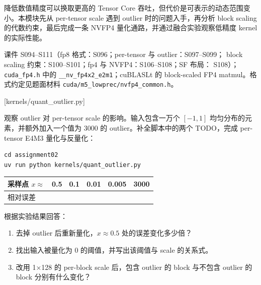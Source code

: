 \documentclass[11pt,a4paper,fontset=fandol]{ctexart}
\begin{document}
降低数值精度可以换取更高的 Tensor Core
吞吐，但代价是可表示的动态范围变小。本模块先从 per-tensor scale 遇到
outlier 时的问题入手，再分析 block scaling 的代数约束，最后完成一条
NVFP4 量化通路，并通过融合实验观察低精度 kernel 的实际性能。

\begin{reading}

课件 S094--S111（fp8 格式：S096；per-tensor 与 outlier：S097--S099；
block scaling 约束：S100--S101；fp4 与 NVFP4：S106--S108；SF 布局：
S108）；\texttt{cuda\_\allowbreak{}fp4.\allowbreak{}h} 中的
\texttt{\_\allowbreak{}\_\allowbreak{}nv\_\allowbreak{}fp4x2\_\allowbreak{}e2m1}；cuBLASLt
的 block-scaled FP4 matmul。格式约定见题面材料
\texttt{cuda/\allowbreak{}m5\_\allowbreak{}lowprec/\allowbreak{}nvfp4\_\allowbreak{}common.\allowbreak{}h}。

\end{reading}

[kernels/quant\_outlier.py]

观察 outlier 对 per-tensor scale 的影响。输入包含一万个 \([-1,1]\)
均匀分布的元素，并额外加入一个值为 3000 的 outlier。补全脚本中的两个
TODO，完成 per-tensor E4M3 量化与反量化：

\begin{verbatim}
cd assignment02
uv run python kernels/quant_outlier.py
\end{verbatim}

\begin{longtable}[]{@{}llllll@{}}
\toprule\noalign{}
采样点 \(x\approx\) & 0.5 & 0.1 & 0.01 & 0.005 & 3000 \\
\midrule\noalign{}
\endhead
\bottomrule\noalign{}
\endlastfoot
相对误差 & & & & & \\
\end{longtable}

根据实验结果回答：

\begin{enumerate}
\def\labelenumi{(\alph{enumi})}
\item
  去掉 outlier 后重新量化，\(x\approx0.5\) 处的误差变化多少倍？
\item
  找出输入被量化为 0 的阈值，并写出该阈值与 scale 的关系式。
\item
  改用 1×128 的 per-block scale 后，包含 outlier 的 block 与不包含
  outlier 的 block 分别有什么变化？
\end{enumerate}
\end{document}
